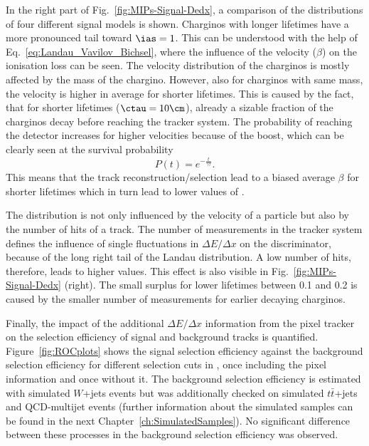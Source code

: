 In the right part of Fig.~\ref{fig:MIPs-Signal-Dedx}, a comparison of the \ias distributions of four different signal models is shown.
Charginos with longer lifetimes have a more pronounced tail toward $\ias=1$.
This can be understood with the help of Eq.~\eqref{eq:Landau_Vavilov_Bichsel}, where the influence of the velocity ($\beta$) on the ionisation loss can be seen.
The velocity distribution of the charginos is mostly affected by the mass of the chargino.
However, also for charginos with same mass, the velocity is higher in average for shorter lifetimes.
This is caused by the fact, that for shorter lifetimes (\eg $\ctau=10\cm$), already a sizable fraction of the charginos decay before reaching the tracker system.
The probability of reaching the detector increases for higher velocities because of the boost, which can be clearly seen at the survival probability
\begin{equation}
P \left( t \right) = e^{-\frac{t}{\gamma \tau}}.
\end{equation} 
This means that the track reconstruction/selection lead to a biased average $\beta$ for shorter lifetimes which in turn lead to lower values of \ias.

The \ias distribution is not only influenced by the velocity of a particle but also by the number of hits of a track.
The number of measurements in the tracker system defines the influence of single fluctuations in $\Delta E/\Delta x$ on the \ias discriminator, because of the long right tail of the Landau distribution.
A low number of hits, therefore, leads to higher \ias values.
This effect is also visible in Fig.~\ref{fig:MIPs-Signal-Dedx} (right). 
The small surplus for lower lifetimes between 0.1 and 0.2 is caused by the smaller number of measurements for earlier decaying charginos.



Finally, the impact of the additional $\Delta E/\Delta x$ information from the pixel tracker on the selection efficiency of signal and background tracks is quantified.
Figure~\ref{fig:ROCplots} shows the signal selection efficiency against the background selection efficiency for different selection cuts in \ias, once including the pixel information and once without it.
The background selection efficiency is estimated with simulated $W$+jets  events but was additionally checked on simulated $t\bar{t}$+jets  and QCD-multijet events 
(further information about the simulated samples can be found in the next Chapter~\ref{ch:SimulatedSamples}).
No significant difference between these processes in the background selection efficiency was observed.

